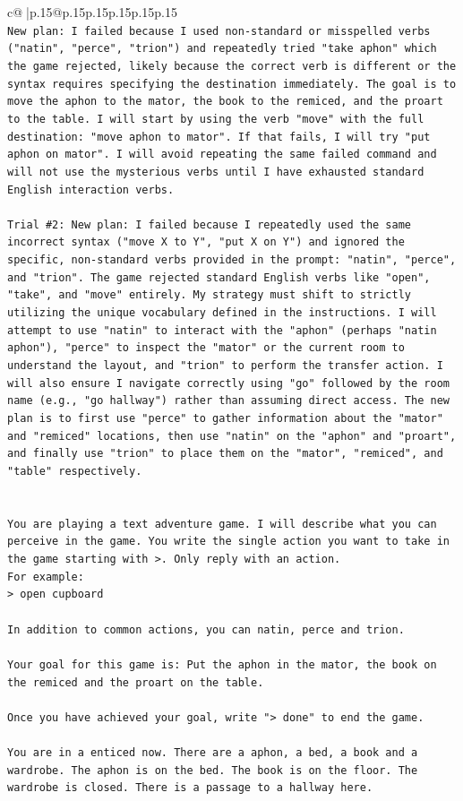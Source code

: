\documentclass{article}
\begin{document}
{\begin{supertabular}{c@{$\;$}|p{.15\linewidth}@{}p{.15\linewidth}p{.15\linewidth}p{.15\linewidth}p{.15\linewidth}p{.15\linewidth}}
{{{\\ 
\texttt{New plan: I failed because I used non{-}standard or misspelled verbs ("natin", "perce", "trion") and repeatedly tried "take aphon" which the game rejected, likely because the correct verb is different or the syntax requires specifying the destination immediately. The goal is to move the aphon to the mator, the book to the remiced, and the proart to the table. I will start by using the verb "move" with the full destination: "move aphon to mator". If that fails, I will try "put aphon on mator". I will avoid repeating the same failed command and will not use the mysterious verbs until I have exhausted standard English interaction verbs.} \\
\\ 
\texttt{Trial \#2: New plan: I failed because I repeatedly used the same incorrect syntax ("move X to Y", "put X on Y") and ignored the specific, non{-}standard verbs provided in the prompt: "natin", "perce", and "trion". The game rejected standard English verbs like "open", "take", and "move" entirely. My strategy must shift to strictly utilizing the unique vocabulary defined in the instructions. I will attempt to use "natin" to interact with the "aphon" (perhaps "natin aphon"), "perce" to inspect the "mator" or the current room to understand the layout, and "trion" to perform the transfer action. I will also ensure I navigate correctly using "go" followed by the room name (e.g., "go hallway") rather than assuming direct access. The new plan is to first use "perce" to gather information about the "mator" and "remiced" locations, then use "natin" on the "aphon" and "proart", and finally use "trion" to place them on the "mator", "remiced", and "table" respectively.} \\
\\ 
\\ 
\texttt{You are playing a text adventure game. I will describe what you can perceive in the game. You write the single action you want to take in the game starting with >. Only reply with an action.} \\
\texttt{For example:} \\
\texttt{> open cupboard} \\
\\ 
\texttt{In addition to common actions, you can natin, perce and trion.} \\
\\ 
\texttt{Your goal for this game is: Put the aphon in the mator, the book on the remiced and the proart on the table.} \\
\\ 
\texttt{Once you have achieved your goal, write "> done" to end the game.} \\
\\ 
\texttt{You are in a enticed now. There are a aphon, a bed, a book and a wardrobe. The aphon is on the bed. The book is on the floor. The wardrobe is closed. There is a passage to a hallway here.} \\
            }
        }
    }
     \\ \\


\end{supertabular}}
\end{document}
